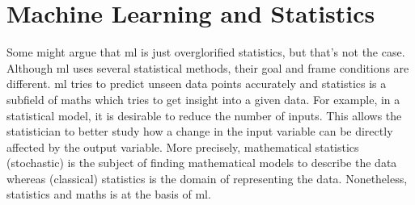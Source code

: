 \section{Machine Learning and Statistics}
Some might argue that \gls{ml} is just overglorified statistics, but that's not the case. 
Although \gls{ml} uses several statistical methods, their goal and frame conditions are different. 
%
\Gls{ml} tries to predict unseen data points accurately and statistics is a subfield of maths 
which tries to get insight into a given data. 
For example, in a statistical model, it is desirable to reduce the number of inputs. 
This allows the statistician to better study how a change in the input variable can be 
directly affected by the output variable.\cite{gontcharov2019}
More precisely, mathematical statistics (stochastic)\cite{haertler2014statistisch} is the subject of 
finding mathematical models to describe the data 
whereas (classical) statistics is the domain of representing the data. 
Nonetheless, statistics and maths is at the basis of \gls{ml}.

